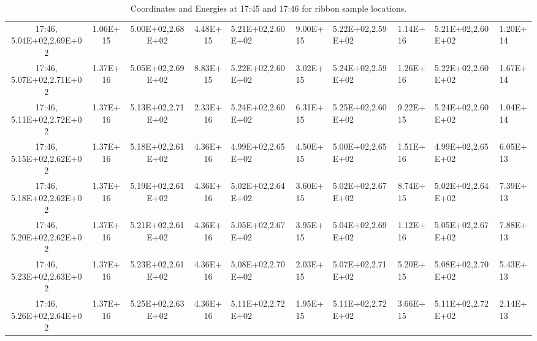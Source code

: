 \begin{table}[H]
\begin{tabular}{|c|c|c|c|}
17:46, 5.04E+02,2.69E+02 & 1.06E+15 & 5.00E+02,2.68E+02 & 4.48E+15 & 5.21E+02,2.60E+02 & 9.00E+15 & 5.22E+02,2.59E+02 & 1.14E+16 & 5.21E+02,2.60E+02 & 1.20E+14\\
17:46, 5.07E+02,2.71E+02 & 1.37E+16 & 5.05E+02,2.69E+02 & 8.83E+15 & 5.22E+02,2.60E+02 & 3.02E+15 & 5.24E+02,2.59E+02 & 1.26E+16 & 5.22E+02,2.60E+02 & 1.67E+14\\
17:46, 5.11E+02,2.72E+02 & 1.37E+16 & 5.13E+02,2.71E+02 & 2.33E+16 & 5.24E+02,2.60E+02 & 6.31E+15 & 5.25E+02,2.60E+02 & 9.22E+15 & 5.24E+02,2.60E+02 & 1.04E+14\\
17:46, 5.15E+02,2.62E+02 & 1.37E+16 & 5.18E+02,2.61E+02 & 4.36E+16 & 4.99E+02,2.65E+02 & 4.50E+15 & 5.00E+02,2.65E+02 & 1.51E+16 & 4.99E+02,2.65E+02 & 6.05E+13\\
17:46, 5.18E+02,2.62E+02 & 1.37E+16 & 5.19E+02,2.61E+02 & 4.36E+16 & 5.02E+02,2.64E+02 & 3.60E+15 & 5.02E+02,2.67E+02 & 8.74E+15 & 5.02E+02,2.64E+02 & 7.39E+13\\
17:46, 5.20E+02,2.62E+02 & 1.37E+16 & 5.21E+02,2.61E+02 & 4.36E+16 & 5.05E+02,2.67E+02 & 3.95E+15 & 5.04E+02,2.69E+02 & 1.12E+16 & 5.05E+02,2.67E+02 & 7.88E+13\\
17:46, 5.23E+02,2.63E+02 & 1.37E+16 & 5.23E+02,2.61E+02 & 4.36E+16 & 5.08E+02,2.70E+02 & 2.03E+15 & 5.07E+02,2.71E+02 & 5.20E+15 & 5.08E+02,2.70E+02 & 5.43E+13\\
17:46, 5.26E+02,2.64E+02 & 1.37E+16 & 5.25E+02,2.63E+02 & 4.36E+16 & 5.11E+02,2.72E+02 & 1.95E+15 & 5.11E+02,2.72E+02 & 3.66E+15 & 5.11E+02,2.72E+02 & 2.14E+13\\
\end{tabular}
\caption{Coordinates and Energies at 17:45 and 17:46 for ribbon sample locations.}\label{ribenergytab}
\end{table}
